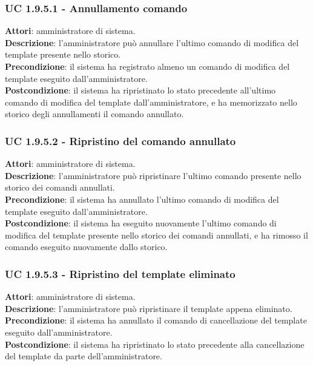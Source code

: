 \subsubsection{UC 1.9.5.1 - Annullamento comando}{
	\label{uc1.9.5.1}
	\textbf{Attori}: amministratore di sistema. \\
	\textbf{Descrizione}: l'amministratore può annullare l'ultimo comando di modifica del template presente nello storico. \\
	\textbf{Precondizione}: il sistema ha registrato almeno un comando di modifica del template eseguito dall'amministratore.	\\
	\textbf{Postcondizione}: il sistema ha ripristinato lo stato precedente all'ultimo comando di modifica del template dall'amministratore, e ha memorizzato nello storico degli	annullamenti il comando annullato.
	}
\subsubsection{UC 1.9.5.2 - Ripristino del comando annullato}{
	\label{uc1.9.5.2}
	\textbf{Attori}: amministratore di sistema. \\
	\textbf{Descrizione}: l'amministratore può ripristinare l'ultimo comando presente nello	storico dei comandi annullati. \\
	\textbf{Precondizione}: il sistema ha annullato l'ultimo comando di modifica del template
	eseguito dall'amministratore.	\\
	\textbf{Postcondizione}: il sistema ha eseguito nuovamente l'ultimo comando di modifica	del template presente nello storico dei comandi annullati, e ha rimosso il comando eseguito nuovamente dallo storico.	
	}
\subsubsection{UC 1.9.5.3 - Ripristino del template eliminato}{
	\label{uc1.9.5.3}
	\textbf{Attori}: amministratore di sistema. \\
	\textbf{Descrizione}: l'amministratore può ripristinare il template appena eliminato. \\
	\textbf{Precondizione}: il sistema ha annullato il comando di cancellazione del template eseguito dall'amministratore.	\\
	\textbf{Postcondizione}: il sistema ha ripristinato lo stato precedente alla cancellazione del template da parte dell'amministratore.	
	}